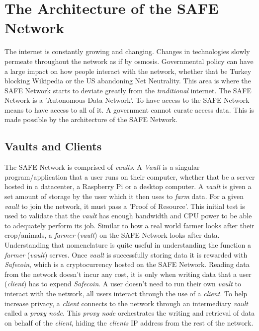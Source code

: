 \chapter{The Architecture of the SAFE Network}
\label{ch:architecture}

The internet is constantly growing and changing. Changes in technologies slowly permeate throughout the network as if by osmosis. Governmental policy can have a large impact on how people interact with the network, whether that be Turkey blocking Wikipedia or the US abandoning Net Neutrality. This area is where the SAFE Network starts to deviate greatly from the \textit{traditional} internet. The SAFE Network is a 'Autonomous Data Network'. To have access to the SAFE Network means to have access to all of it. A government cannot curate access data. This is made possible by the architecture of the SAFE Network.

\section{Vaults and Clients}

The SAFE Network is comprised of \textit{vaults}. A \textit{Vault} is a singular program/application that a user runs on their computer, whether that be a server hosted in a datacenter, a Raspberry Pi or a desktop computer. A \textit{vault} is given a set amount of storage by the user which it then uses to \textit{farm} data. For a given \textit{vault} to join the network, it must pass a 'Proof of Resource'. This initial test is used to validate that the \textit{vault} has enough bandwidth and CPU power to be able to adequately perform its job. Similar to how a real world farmer looks after their crop/animals, a \textit{farmer} (\textit{vault}) on the SAFE Network looks after data. Understanding that nomenclature is quite useful in understanding the function a \textit{farmer} (\textit{vault}) serves. Once \textit{vault} is successfully storing data it is rewarded with \textit{Safecoin}, which is a cryptocurrency hosted on the SAFE Network. Reading data from the network doesn't incur any cost, it is only when writing data that a user (\textit{client}) has to expend \textit{Safecoin}. A user doesn't need to run their own \textit{vault} to interact with the network, all users interact through the use of a \textit{client}. To help increase privacy, a \textit{client} connects to the network through an intermediary \textit{vault} called a \textit{proxy node}. This \textit{proxy node} orchestrates the writing and retrieval of data on behalf of the \textit{client}, hiding the \textit{clients} IP address from the rest of the network.

